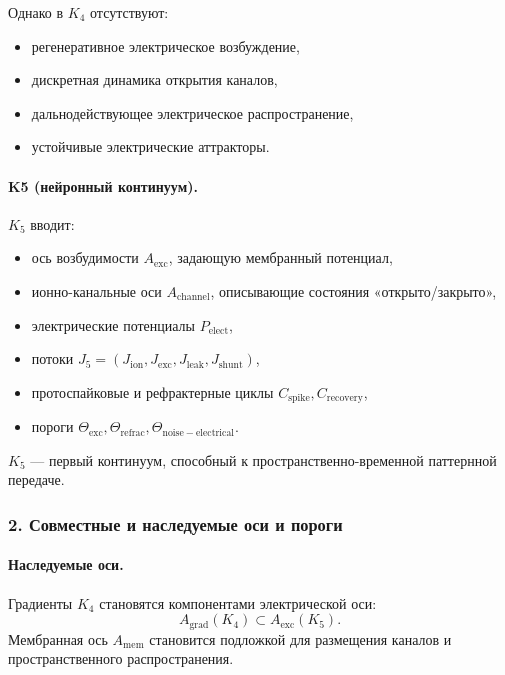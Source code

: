 Однако в $K_4$ отсутствуют:
\begin{itemize}
  \item регенеративное электрическое возбуждение,
  \item дискретная динамика открытия каналов,
  \item дальнодействующее электрическое распространение,
  \item устойчивые электрические аттракторы.
\end{itemize}

\paragraph{K5 (нейронный континуум).}
$K_5$ вводит:
\begin{itemize}
  \item ось возбудимости $A_{\mathrm{exc}}$, задающую мембранный потенциал,
  \item ионно-канальные оси $A_{\mathrm{channel}}$, описывающие состояния
        «открыто/закрыто»,
  \item электрические потенциалы $P_{\mathrm{elect}}$,
  \item потоки $J_5 = (J_{\mathrm{ion}}, J_{\mathrm{exc}}, J_{\mathrm{leak}},
        J_{\mathrm{shunt}})$,
  \item протоспайковые и рефрактерные циклы
        $C_{\mathrm{spike}},C_{\mathrm{recovery}}$,
  \item пороги $\Theta_{\mathrm{exc}}, \Theta_{\mathrm{refrac}},
        \Theta_{\mathrm{noise-electrical}}$.
\end{itemize}

$K_5$ — первый континуум, способный к пространственно-временной
паттернной передаче.

\subsubsection{2. Совместные и наследуемые оси и пороги}

\paragraph{Наследуемые оси.}
Градиенты $K_4$ становятся компонентами электрической оси:
\[
A_{\mathrm{grad}}(K_4) \subset A_{\mathrm{exc}}(K_5).
\]
Мембранная ось $A_{\mathrm{mem}}$ становится подложкой для размещения
каналов и пространственного распространения.

